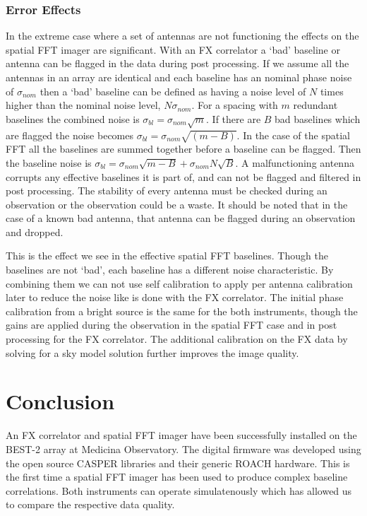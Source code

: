 \documentclass[useAMS,macros,usenatbib,onecolumn]{mn2e}
\begin{document}
\subsubsection{Error Effects}
\label{sfft_error}

In the extreme case where a set of antennas are not functioning the effects on the spatial FFT imager are significant.
With an FX correlator a `bad' baseline or antenna can be flagged in the data during post processing.
If we assume all the antennas in an array are identical and each baseline has an nominal phase noise of $\sigma_{nom}$ then a `bad' baseline can be defined as having a noise level of $N$ times higher than the nominal noise level, $N\sigma_{nom}$.
For a spacing with $m$ redundant baselines the combined noise is $\sigma_{bl}=\sigma_{nom}\sqrt{m}$.
If there are $B$ bad baselines which are flagged the noise becomes $\sigma_{bl}=\sigma_{nom}\sqrt{(m-B)}$.
In the case of the spatial FFT all the baselines are summed together before a baseline can be flagged.
Then the baseline noise is $\sigma_{bl}=\sigma_{nom}\sqrt{m-B}+\sigma_{nom}N\sqrt{B}$.
A malfunctioning antenna corrupts any effective baselines it is part of, and can not be flagged and filtered in post processing.
The stability of every antenna must be checked during an observation or the observation could be a waste.
It should be noted that in the case of a known bad antenna, that antenna can be flagged during an observation and dropped.

This is the effect we see in the effective spatial FFT baselines.
Though the baselines are not `bad', each baseline has a different noise characteristic.
By combining them we can not use self calibration to apply per antenna calibration later to reduce the noise like is done with the FX correlator.
The initial phase calibration from a bright source is the same for the both instruments, though the gains are applied during the observation in the spatial FFT case and in post processing for the FX correlator.
The additional calibration on the FX data by solving for a sky model solution further improves the image quality.

\section{Conclusion}
\label{conclusion}

An FX correlator and spatial FFT imager have been successfully installed on the BEST-2 array at Medicina Observatory.
The digital firmware was developed using the open source CASPER libraries and their generic ROACH hardware.
This is the first time a spatial FFT imager has been used to produce complex baseline correlations.
Both instruments can operate simulatenously which has allowed us to compare the respective data quality.
\end{document}
